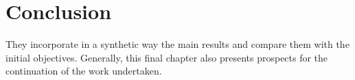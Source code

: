 \chapter{Conclusion}
\label{Chap6}
They incorporate in a synthetic way the main results and compare them with the
initial objectives. Generally, this final chapter also presents prospects for the continuation of the
work undertaken.